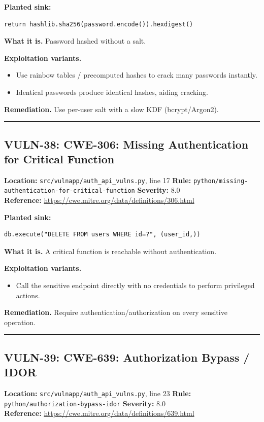 \documentclass[11pt,a4paper]{article}
\begin{document}
\noindent\textbf{Planted sink:}
\begin{lstlisting}
return hashlib.sha256(password.encode()).hexdigest()
\end{lstlisting}
\noindent\textbf{What it is.} Password hashed without a salt.

\noindent\textbf{Exploitation variants.}
\begin{itemize}[leftmargin=1.4em,itemsep=1pt,topsep=2pt]
\item Use rainbow tables / precomputed hashes to crack many passwords instantly.
\item Identical passwords produce identical hashes, aiding cracking.
\end{itemize}
\noindent\textbf{Remediation.} Use per-user salt with a slow KDF (bcrypt/Argon2).

\vspace{4pt}\hrule\vspace{6pt}
\subsection{VULN-38: CWE-306: Missing Authentication for Critical Function}
\noindent\textbf{Location:} \texttt{src/vulnapp/auth\_api\_vulns.py}, line 17 \quad \textbf{Rule:} \texttt{python/missing-authentication-for-critical-function} \quad \textbf{Severity:} 8.0
\\ \textbf{Reference:} \url{https://cwe.mitre.org/data/definitions/306.html}

\noindent\textbf{Planted sink:}
\begin{lstlisting}
db.execute("DELETE FROM users WHERE id=?", (user_id,))
\end{lstlisting}
\noindent\textbf{What it is.} A critical function is reachable without authentication.

\noindent\textbf{Exploitation variants.}
\begin{itemize}[leftmargin=1.4em,itemsep=1pt,topsep=2pt]
\item Call the sensitive endpoint directly with no credentials to perform privileged actions.
\end{itemize}
\noindent\textbf{Remediation.} Require authentication/authorization on every sensitive operation.

\vspace{4pt}\hrule\vspace{6pt}
\subsection{VULN-39: CWE-639: Authorization Bypass / IDOR}
\noindent\textbf{Location:} \texttt{src/vulnapp/auth\_api\_vulns.py}, line 23 \quad \textbf{Rule:} \texttt{python/authorization-bypass-idor} \quad \textbf{Severity:} 8.0
\\ \textbf{Reference:} \url{https://cwe.mitre.org/data/definitions/639.html}
\end{document}
